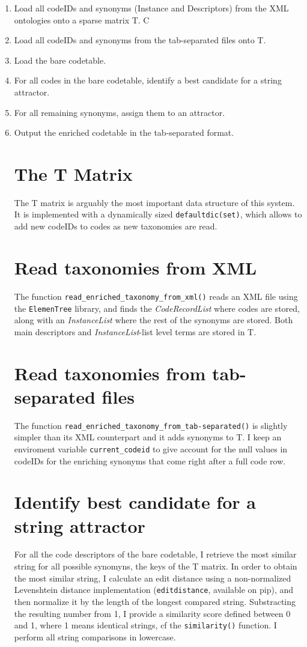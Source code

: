 \documentclass[12pt]{article}%
\begin{document}
\begin{enumerate}
\item Load all codeIDs and synonyms (Instance and Descriptors) from the XML ontologies onto a sparse matrix T. C
\item Load all codeIDs and synonyms from the tab-separated files onto T.
\item Load the bare codetable.
\item For all codes in the bare codetable, identify a best candidate for a string attractor.
\item For all remaining synonyms, assign them to an attractor.
\item Output the enriched codetable in the tab-separated format.

\section{The T Matrix}
The T matrix is arguably the most important data structure of this system. It is implemented with a dynamically sized \texttt{defaultdic(set)}, which allows to add new codeIDs to codes as new taxonomies are read.
\section{Read taxonomies from XML}
The function \texttt{read\_enriched\_taxonomy\_from\_xml()} reads an XML file using the \texttt{ElemenTree} library, and finds the \textit{CodeRecordList} where codes are stored, along with an \textit{InstanceList} where the rest of the synonyms are stored. Both main descriptors and \textit{InstanceList}-list level terms are stored in T.

\section{Read taxonomies from tab-separated files}
The function \texttt{read\_enriched\_taxonomy\_from\_tab-separated()} is slightly simpler than its XML counterpart and it adds synonyms to T. I keep an enviroment variable \texttt{current\_codeid} to give account for the null values in codeIDs for the enriching synonyms that come right after a full code row. 

\section{Identify best candidate for a string attractor}
For all the code descriptors of the bare codetable, I retrieve the most similar string for all possible synomyns, the keys of the T matrix. In order to obtain the most similar string, I calculate an edit distance using a non-normalized Levenshtein distance implementation (\texttt{editdistance}, available on pip), and then normalize it by the length of the longest compared string. Substracting the resulting number from 1, I provide a similarity score defined between 0 and 1, where 1 means identical strings, cf the \texttt{similarity()} function. I perform all string comparisons in lowercase.




\end{enumerate}
\end{document}
